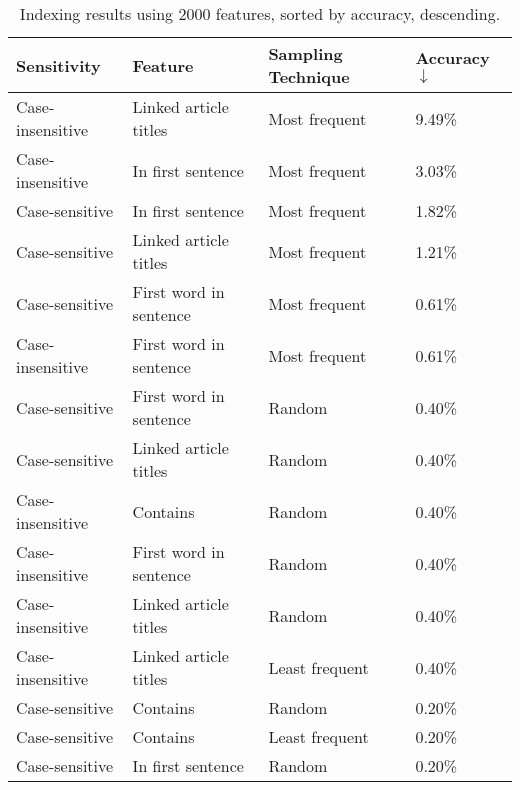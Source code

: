 \begin{center}
\begin{table}[h]
\caption{Indexing results using 2000 features, sorted by accuracy, descending.}
\begin{tabular}{llll}
\textbf{Sensitivity} & \textbf{Feature}       & \textbf{Sampling Technique} & \textbf{Accuracy $\downarrow$} \\ \hline
Case-insensitive     & Linked article titles  & Most frequent               & 9.49\%             \\ \hline
Case-insensitive     & In first sentence      & Most frequent               & 3.03\%             \\ \hline
Case-sensitive       & In first sentence      & Most frequent               & 1.82\%             \\ \hline
Case-sensitive       & Linked article titles  & Most frequent               & 1.21\%             \\ \hline
Case-sensitive       & First word in sentence & Most frequent               & 0.61\%             \\ \hline
Case-insensitive     & First word in sentence & Most frequent               & 0.61\%             \\ \hline
Case-sensitive       & First word in sentence & Random                      & 0.40\%             \\ \hline
Case-sensitive       & Linked article titles  & Random                      & 0.40\%             \\ \hline
Case-insensitive     & Contains               & Random                      & 0.40\%             \\ \hline
Case-insensitive     & First word in sentence & Random                      & 0.40\%             \\ \hline
Case-insensitive     & Linked article titles  & Random                      & 0.40\%             \\ \hline
Case-insensitive     & Linked article titles  & Least frequent              & 0.40\%             \\ \hline
Case-sensitive       & Contains               & Random                      & 0.20\%             \\ \hline
Case-sensitive       & Contains               & Least frequent              & 0.20\%             \\ \hline
Case-sensitive       & In first sentence      & Random                      & 0.20\%             \\ \hline

\end{tabular}
\end{table}
\end{center}
